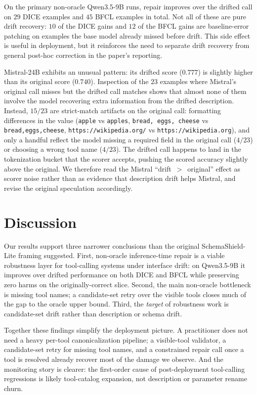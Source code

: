 \documentclass[runningheads]{llncs}
\newcommand{\method}{SchemaShield-Lite\xspace}
\begin{document}
On the primary non-oracle Qwen3.5-9B runs, repair improves over the drifted call on
$29$ DICE examples and $45$ BFCL examples in total. Not all of these are pure drift
recovery: $10$ of the DICE gains and $12$ of the BFCL gains are baseline-error
patching on examples the base model already missed before drift. This side effect is
useful in deployment, but it reinforces the need to separate drift recovery from
general post-hoc correction in the paper's reporting.

Mistral-24B exhibits an unusual pattern: its drifted score ($0.777$) is
slightly higher than its original score ($0.740$). Inspection of the $23$
examples where Mistral's original call misses but the drifted call matches
shows that almost none of them involve the model recovering extra information
from the drifted description. Instead, $15/23$ are strict-match artifacts on
the original call: formatting differences in the value (\texttt{apple} vs
\texttt{apples}, \texttt{bread, eggs, cheese} vs \texttt{bread,eggs,cheese},
\texttt{https://wikipedia.org/} vs \texttt{https://wikipedia.org}), and only
a handful reflect the model missing a required field in the original call
($4/23$) or choosing a wrong tool name ($4/23$). The drifted call happens to
land in the tokenization bucket that the scorer accepts, pushing the scored
accuracy slightly above the original. We therefore read the Mistral
``drift~$>$~original'' effect as scorer noise rather than as evidence that
description drift helps Mistral, and revise the original speculation
accordingly.

\section{Discussion}
Our results support three narrower conclusions than the original \method framing
suggested. First, non-oracle inference-time repair is a viable robustness layer for
tool-calling systems under interface drift: on Qwen3.5-9B it improves over drifted
performance on both DICE and BFCL while preserving zero harms on the
originally-correct slice. Second, the main non-oracle bottleneck is missing tool
names; a candidate-set retry over the visible tools closes much of the gap to the
oracle upper bound. Third, the \emph{target} of robustness work is candidate-set
drift rather than description or schema drift.

Together these findings simplify the deployment picture. A practitioner does not
need a heavy per-tool canonicalization pipeline; a visible-tool validator, a
candidate-set retry for missing tool names, and a constrained repair call once a
tool is resolved already recover most of the damage we observe. And the monitoring
story is clearer: the first-order cause of post-deployment tool-calling regressions
is likely tool-catalog expansion, not description or parameter rename churn.
\end{document}
